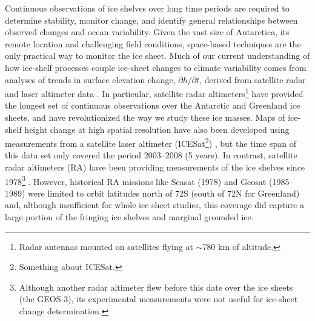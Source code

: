 Continuous observations of ice shelves over long time periods are required to determine stability,
monitor change, and identify general relationships between observed changes and ocean
variability. Given the vast size of Antarctica, its remote location and challenging field conditions,
space-based techniques are the only practical way to monitor the ice sheet.
Much of our current understanding of how ice-shelf processes couple ice-sheet changes to climate variability comes from analyses of trends in surface elevation change, $\partial h / \partial t$, derived from satellite radar and laser altimeter data \parencite{Zwally2005, Shepherd2010, Pritchard2012, Fricker2012}.
In particular, satellite radar altimeters\footnote{Radar antennas mounted on satellites flying at
$\sim$780 km of altitude.}
have provided the longest set of continuous observations over the Antarctic and Greenland ice sheets, and have revolutionized the way we study these ice masses. Maps of ice-shelf height change at high spatial resolution have also been developed using measurements from a satellite laser altimeter (ICESat\footnote{Something about ICESat.}) \parencite{Pritchard2012}, but the time span of this data set only covered the period 2003--2008 (5 years). In contrast, satellite radar altimeters (RA) have been providing
measurements of the ice shelves since 1978\footnote{Although another radar altimeter flew before
this date over the ice sheets (the GEOS-3), its experimental measurements were not
useful for ice-sheet change determination.} \parencite{Zwally1983, Zwally1989, Davis1998, Martin1983}. However,
historical RA missions like Seasat (1978) and Geosat (1985--1989) were limited to orbit latitudes north of 72\degree S (south of 72\degree N for Greenland) and, although insufficient for whole ice sheet studies, this coverage did capture a large portion of the fringing ice shelves and marginal grounded ice.

